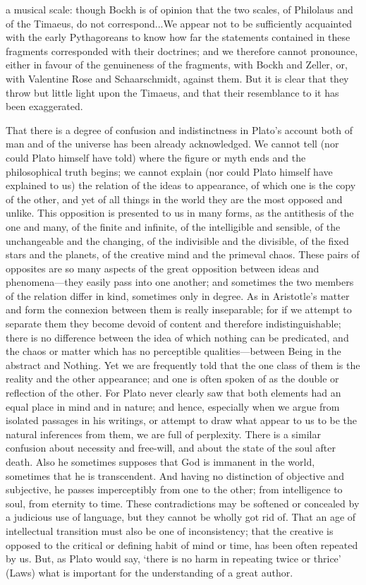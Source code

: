 \documentclass[11pt,letter]{article}
\begin{document}
a musical scale: though Bockh is of opinion that the two scales, of Philolaus and of the Timaeus, do not correspond...We appear not to be sufficiently acquainted with the early Pythagoreans to know how far the statements contained in these fragments corresponded with their doctrines; and we therefore cannot pronounce, either in favour of the genuineness of the fragments, with Bockh and Zeller, or, with Valentine Rose and Schaarschmidt, against them. But it is clear that they throw but little light upon the Timaeus, and that their resemblance to it has been exaggerated.

\par  That there is a degree of confusion and indistinctness in Plato’s account both of man and of the universe has been already acknowledged. We cannot tell (nor could Plato himself have told) where the figure or myth ends and the philosophical truth begins; we cannot explain (nor could Plato himself have explained to us) the relation of the ideas to appearance, of which one is the copy of the other, and yet of all things in the world they are the most opposed and unlike. This opposition is presented to us in many forms, as the antithesis of the one and many, of the finite and infinite, of the intelligible and sensible, of the unchangeable and the changing, of the indivisible and the divisible, of the fixed stars and the planets, of the creative mind and the primeval chaos. These pairs of opposites are so many aspects of the great opposition between ideas and phenomena—they easily pass into one another; and sometimes the two members of the relation differ in kind, sometimes only in degree. As in Aristotle’s matter and form the connexion between them is really inseparable; for if we attempt to separate them they become devoid of content and therefore indistinguishable; there is no difference between the idea of which nothing can be predicated, and the chaos or matter which has no perceptible qualities—between Being in the abstract and Nothing. Yet we are frequently told that the one class of them is the reality and the other appearance; and one is often spoken of as the double or reflection of the other. For Plato never clearly saw that both elements had an equal place in mind and in nature; and hence, especially when we argue from isolated passages in his writings, or attempt to draw what appear to us to be the natural inferences from them, we are full of perplexity. There is a similar confusion about necessity and free-will, and about the state of the soul after death. Also he sometimes supposes that God is immanent in the world, sometimes that he is transcendent. And having no distinction of objective and subjective, he passes imperceptibly from one to the other; from intelligence to soul, from eternity to time. These contradictions may be softened or concealed by a judicious use of language, but they cannot be wholly got rid of. That an age of intellectual transition must also be one of inconsistency; that the creative is opposed to the critical or defining habit of mind or time, has been often repeated by us. But, as Plato would say, ‘there is no harm in repeating twice or thrice’ (Laws) what is important for the understanding of a great author.
\end{document}
